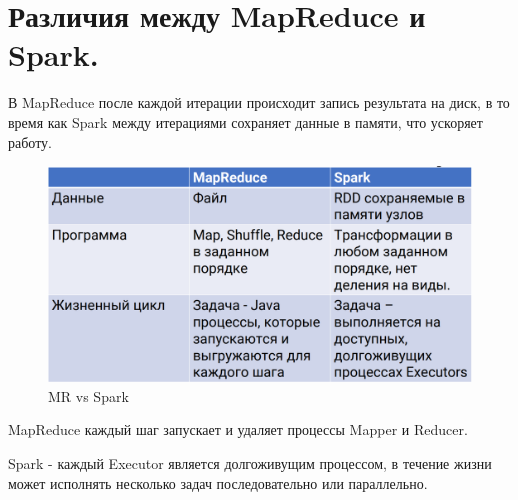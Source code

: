 \section{Различия между MapReduce и Spark.}

В MapReduce после каждой итерации происходит запись
результата на диск, в то время как Spark между итерациями
сохраняет данные в памяти, что ускоряет работу.

\begin{figure}[H]
	\centering
	\begin{minipage}[b]{0.8\textwidth}
		\includegraphics[width=\textwidth]{images/mrvspark.png}
		\caption{MR vs Spark}
	\end{minipage}
\end{figure}

MapReduce каждый шаг запускает и удаляет процессы Mapper
и Reducer.

Spark - каждый Executor является долгоживущим процессом,
в течение жизни может исполнять несколько задач последовательно
или параллельно.